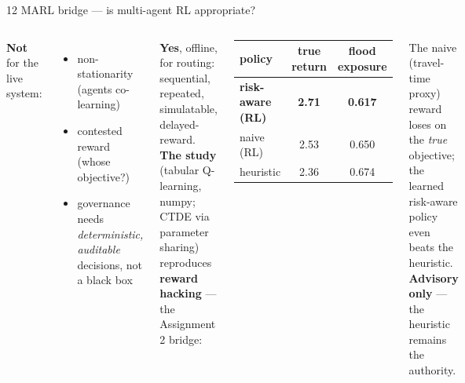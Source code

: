 \documentclass[aspectratio=169,11pt]{beamer}
\begin{document}
\begin{frame}{12 \;\; MARL bridge --- is multi-agent RL appropriate?}
  \small
  \begin{columns}[T]
    \textbf{Not} for the live system:
    \begin{itemize}\footnotesize
      \item non-stationarity (agents co-learning)
      \item contested reward (whose objective?)
      \item governance needs \emph{deterministic, auditable} decisions, not a black box
    \end{itemize}
    \textbf{Yes}, offline, for routing: sequential, repeated, simulatable, delayed-reward.
    \textbf{The study} (tabular Q-learning, numpy; CTDE via parameter sharing) reproduces
    \textbf{reward hacking} --- the Assignment 2 bridge:
    \begin{center}\footnotesize
    \begin{tabular}{@{}lcc@{}}
      \toprule
      policy & true return & flood exposure \\
      \midrule
      \textbf{risk-aware (RL)} & \textbf{2.71} & \textbf{0.617} \\
      naive (RL) & 2.53 & 0.650 \\
      heuristic & 2.36 & 0.674 \\
      \bottomrule
    \end{tabular}
    \end{center}
    The naive (travel-time proxy) reward loses on the \emph{true} objective; the learned risk-aware
    policy even beats the heuristic. \textbf{Advisory only} --- the heuristic remains the authority.
  \end{columns}
\end{frame}
\end{document}
